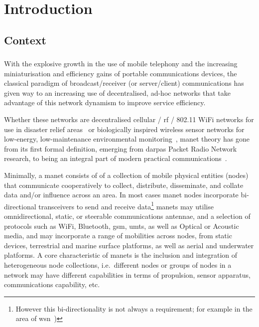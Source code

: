 
\chapter{Introduction}
\label{ch:introduction}

\section{Context}

\subsection[Mobile Ad-Hoc Networks]{}\label{manets}

With the explosive growth in the use of mobile telephony and the increasing miniaturisation and efficiency gains of portable communications devices, the classical paradigm of broadcast/receiver (or server/client) communications has given way to an increasing use of decentralised, ad-hoc networks that take advantage of this network dynamism to improve service efficiency.

Whether these networks are decentralised cellular / \gls{rf} / 802.11 WiFi networks for use in disaster relief areas~\cite{Milliken2015} or biologically inspired wireless sensor networks for low-energy, low-maintenance environmental monitoring~\cite{Nicholson2008,Selvakennedy2007}, \gls{manet} theory has gone from its first formal definition, emerging from \glspl{darpa} Packet Radio Network research, to being an integral part of modern practical communications~\cite{Jubin1987}.

Minimally, a \gls{manet} consists of of a collection of mobile physical entities (nodes) that communicate cooperatively to collect, distribute, disseminate, and collate data and/or influence across an area.
In most cases \gls{manet} nodes incorporate bi-directional transceivers to send and receive data\footnote{However this bi-directionality is not always a requirement; for example in the area of \gls{wsn}~\cite{Akyildiz2002})}
\glspl{manet} may utilise omnidirectional, static, or steerable communications antennae, and a selection of protocols such as WiFi, Bluetooth, \gls{gsm}, \gls{umts}, as well as Optical or Acoustic media, and may incorporate a range of mobilities across nodes, from static devices, terrestrial and marine surface platforms, as well as aerial and underwater platforms.
A core characteristic of \glspl{manet} is the inclusion and integration of heterogeneous node collections, i.e.\ different nodes or groups of nodes in a network may have different capabilities in terms of propulsion, sensor apparatus, communications capability, etc.

